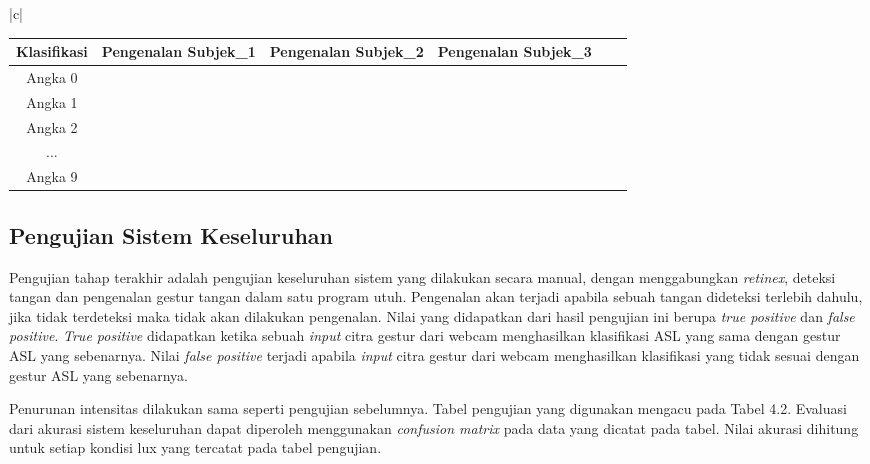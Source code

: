 \begin{table}[H]
\begin{tabular}{|c|}
	\\
	\begin{tabular}{|c|c|c|c|c|c|c|c|c|c|c|c|c|c|c|c|c|c|c|c|c|c|c|c|c|c|c|c|c|c|c|c|c|}
		\hline
		Klasifikasi & \multicolumn{10}{|c|}{Pengenalan Subjek\_1}& \multicolumn{10}{|c|}{Pengenalan Subjek\_2}& \multicolumn{10}{|c|}{Pengenalan Subjek\_3}\\
		\hline Angka 0 & & & &&&&&&&&&&&&&&&&&&&&&&&&&&&\\
		\hline Angka 1 & & & &&&&&&&&&&&&&&&&&&&&&&&&&&&\\	
		\hline Angka 2 & & & &&&&&&&&&&&&&&&&&&&&&&&&&&&\\
		\hline ... & & & &&&&&&&&&&&&&&&&&&&&&&&&&&& \\
		\hline Angka 9 & & & &&&&&&&&&&&&&&&&&&&&&&&&&&& \\
		\hline
		
	\end{tabular}

\end{tabular}
\end{table}
\subsection{Pengujian Sistem Keseluruhan}
Pengujian tahap terakhir adalah pengujian keseluruhan sistem yang dilakukan secara manual, dengan menggabungkan \emph{retinex}, deteksi tangan dan pengenalan gestur tangan dalam satu program utuh. Pengenalan akan terjadi apabila sebuah tangan dideteksi terlebih dahulu, jika tidak terdeteksi maka tidak akan dilakukan pengenalan. Nilai yang didapatkan dari hasil pengujian ini berupa \emph{true positive} dan \emph{false positive}. \emph{True positive} didapatkan ketika sebuah \emph{input} citra gestur dari webcam menghasilkan klasifikasi ASL yang sama dengan gestur ASL yang sebenarnya. Nilai \emph{false positive} terjadi apabila \emph{input} citra gestur dari webcam menghasilkan klasifikasi yang tidak sesuai dengan gestur ASL yang sebenarnya.

Penurunan intensitas dilakukan sama seperti pengujian sebelumnya. Tabel pengujian yang digunakan mengacu pada Tabel 4.2. Evaluasi dari akurasi sistem keseluruhan dapat diperoleh menggunakan \emph{confusion matrix} pada data yang dicatat pada tabel. Nilai akurasi dihitung untuk setiap kondisi lux yang tercatat pada tabel pengujian.